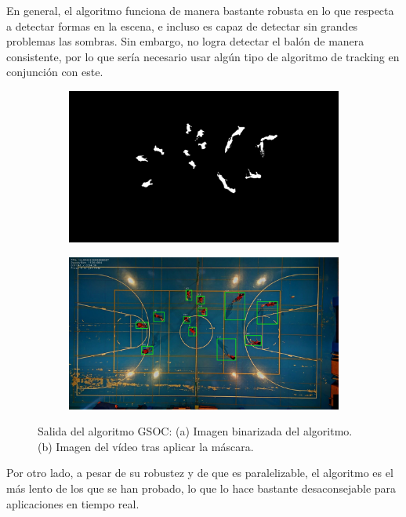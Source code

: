 En general, el algoritmo funciona de manera bastante robusta en lo que respecta a detectar formas en la escena, e incluso es capaz de detectar sin grandes problemas las sombras. Sin embargo, no logra detectar el balón de manera consistente, por lo que sería necesario usar algún tipo de algoritmo de tracking en conjunción con este.

\begin{figure}
\begin{subfigure}{.5\textwidth}
  \centering
  \includegraphics[width=.9\linewidth]{images/GSOCsub}
  \caption { }
  \label{fig:GSOC1a}
\end{subfigure}%
\begin{subfigure}{.5\textwidth}
  \centering
  \includegraphics[width=.9\linewidth]{images/GSOC}
  \caption { }
  \label{fig:GSOC1b}
\end{subfigure}
\caption{Salida del algoritmo GSOC: (a) Imagen binarizada del algoritmo. (b) Imagen del vídeo tras aplicar la máscara.}
\label{fig:GSOC}
\end{figure}

Por otro lado, a pesar de su robustez y de que es paralelizable, el algoritmo es el más lento de los que se han probado, lo que lo hace bastante desaconsejable para aplicaciones en tiempo real.

